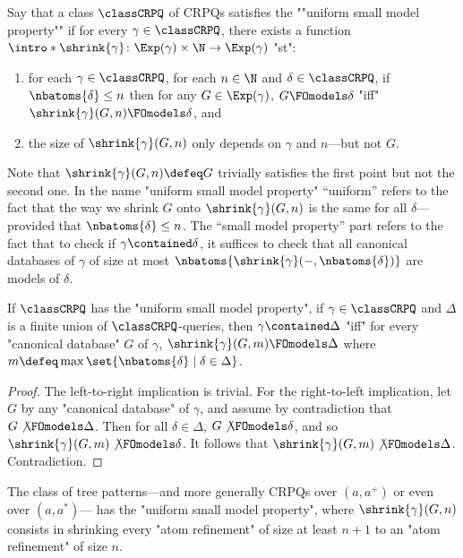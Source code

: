 Say that a class $\classCRPQ$ of CRPQs satisfies the \AP""uniform small model property""
if for every $\gamma \in \classCRPQ$, there exists a function
$\intro*\shrink{\gamma}\colon \Exp(\gamma) \times \N \to \Exp(\gamma)$ "st":
\begin{enumerate}
  \item for each $\gamma \in \classCRPQ$, for each $n \in \N$ and $\delta \in \classCRPQ$,
  if $\nbatoms{\delta} \leq n$ then for any $G \in \Exp(\gamma)$, $G \FOmodels \delta$ "iff"
  $\shrink{\gamma}(G, n) \FOmodels \delta$, and
  \item the size of $\shrink{\gamma}(G, n)$ only depends on $\gamma$ and $n$---but not $G$.
\end{enumerate} 
Note that $\shrink{\gamma}(G, n) \defeq G$ trivially satisfies the first point but not the second one.
In the name "uniform small model property" ``uniform'' refers to the fact
that the way we shrink $G$ onto $\shrink{\gamma}(G,n)$ is the same for all $\delta$---provided that $\nbatoms{\delta} \leq n$. The ``small model property'' part refers to the fact that to check if
$\gamma \contained \delta$, it suffices to check that all canonical databases of $\gamma$
of size at most $\nbatoms{\shrink{\gamma}(-, \nbatoms{\delta})}$ are models of $\delta$.

\begin{proposition}
  \AP\label{prop:containment-uniform-smp}
  If $\classCRPQ$ has the "uniform small model property", if $\gamma \in \classCRPQ$ and $\Delta$ 
  is a finite union of $\classCRPQ$-queries, then
  $\gamma \contained \Delta$ "iff" for every "canonical database" $G$ of $\gamma$,
  $\shrink{\gamma}(G, m) \FOmodels \Delta$
  where $m \defeq \max{\set{\nbatoms{\delta} \mid \delta \in \Delta}}$.
\end{proposition}

\begin{proof}
  The left-to-right implication is trivial. For the right-to-left implication, 
  let $G$ by any "canonical database" of $\gamma$,
  and assume by contradiction that $G \not\FOmodels \Delta$.
  Then for all $\delta \in \Delta$, $G \not\FOmodels \delta$,
  and so $\shrink{\gamma}(G, m) \not\FOmodels \delta$.
  It follows that $\shrink{\gamma}(G, m) \not\FOmodels \Delta$.
  Contradiction.
\end{proof}

\begin{proposition}
  \AP\label{prop:tree-patterns-uniform-smp}
  The class of tree patterns---and more generally CRPQs over $(a, a^+)$ or even over $(a, a^*)$---
  has the "uniform small model property", where $\shrink{\gamma}(G, n)$ consists
  in shrinking every "atom refinement" of size at least $n+1$ to an "atom refinement" of
  size $n$.
\end{proposition}

